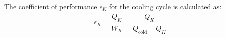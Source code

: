 The coefficient of performance \( \epsilon_K \) for the cooling cycle is calculated as:  
\[
\epsilon_K = \frac{\dot{Q}_K}{\dot{W}_K} = \frac{\dot{Q}_K}{\dot{Q}_{\text{cold}} - \dot{Q}_K}
\]